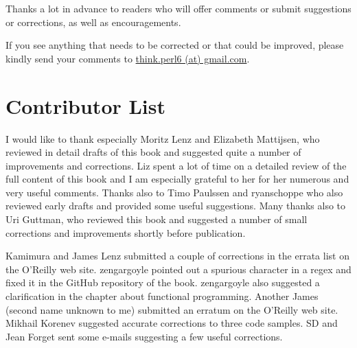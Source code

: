 Thanks a lot in advance to readers who will offer comments 
or submit suggestions or corrections, as well as encouragements.

If you see anything that needs to be corrected or that 
could be improved, please kindly send your comments to 
\url{think.perl6 (at) gmail.com}.


\section*{Contributor List}

I would like to thank especially Moritz Lenz and Elizabeth 
Mattijsen, who reviewed in detail drafts of this book 
and suggested quite a number of improvements and corrections. Liz 
spent a lot of time on a detailed review of the full 
content of this book and I am especially grateful to her for 
her numerous and very useful comments. Thanks also to Timo Paulssen and 
ryanschoppe who also reviewed early drafts and provided some  
useful suggestions. Many thanks also to Uri Guttman, who reviewed 
this book and suggested a number of small corrections and improvements 
shortly before publication. 

Kamimura and James Lenz submitted a couple of  
corrections in the errata list on the O'Reilly web site.
zengargoyle pointed out a spurious character in a regex 
and fixed it in the GitHub repository of the book. zengargoyle
also suggested a clarification in the chapter about functional 
programming. Another James (second name unknown to me) 
submitted an erratum on the O'Reilly web site. Mikhail Korenev 
suggested accurate corrections to three code samples. 
SD and Jean Forget sent some e-mails 
suggesting a few useful corrections.

\clearemptydoublepage

\begin{latexonly}

\tableofcontents

\clearemptydoublepage

\end{latexonly}

